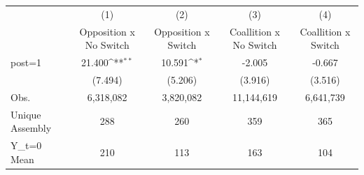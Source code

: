 {
\def\sym#1{\ifmmode^{#1}\else\(^{#1}\)\fi}
\begin{tabular}{l*{4}{c}}
\hline\hline
                    &\multicolumn{1}{c}{(1)}&\multicolumn{1}{c}{(2)}&\multicolumn{1}{c}{(3)}&\multicolumn{1}{c}{(4)}\\
                    &\multicolumn{1}{c}{Opposition x No Switch}&\multicolumn{1}{c}{Opposition x Switch}&\multicolumn{1}{c}{Coallition x No Switch}&\multicolumn{1}{c}{Coallition x Switch}\\
\hline
post=1              &      21.400\sym{**} &      10.591\sym{*}  &      -2.005         &      -0.667         \\
                    &     (7.494)         &     (5.206)         &     (3.916)         &     (3.516)         \\
\hline
Obs.                &   6,318,082         &   3,820,082         &  11,144,619         &   6,641,739         \\
Unique Assembly     &         288         &         260         &         359         &         365         \\
Y\_t=0 Mean          &         210         &         113         &         163         &         104         \\
\hline\hline
\end{tabular}
}
